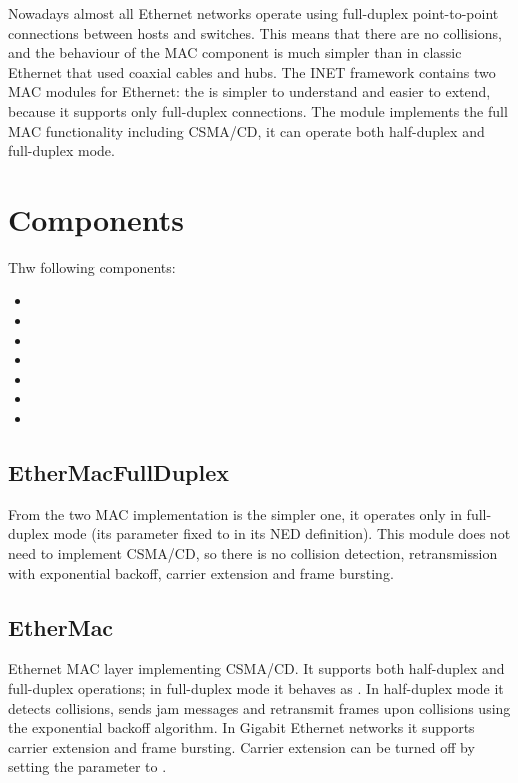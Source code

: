 Nowadays almost all Ethernet networks operate using full-duplex
point-to-point connections between hosts and switches. This means
that there are no collisions, and the behaviour of the MAC component
is much simpler than in classic Ethernet that used coaxial cables and
hubs. The INET framework contains two MAC modules for Ethernet:
the  is simpler to understand and easier to extend,
because it supports only full-duplex connections. The 
module implements the full MAC functionality including CSMA/CD, it
can operate both half-duplex and full-duplex mode.

\section{Components}
\label{sec:ethernet:components}

Thw following components:

\begin{itemize}
  \item {}
  \item {}
  \item {}
  \item {}
  \item {}
  \item {}
  \item {}
\end{itemize}


\subsection{EtherMacFullDuplex}
\label{sec:ethernet:ethermacfullduplex}

From the two MAC implementation  is the simpler one,
it operates only in full-duplex mode (its  parameter fixed to
 in its NED definition). This module does not need to implement
CSMA/CD, so there is no collision detection, retransmission with exponential backoff,
carrier extension and frame bursting.

\subsection{EtherMac}
\label{sec:ethernet:ethermac}

Ethernet MAC layer implementing CSMA/CD. It supports both half-duplex and full-duplex operations;
in full-duplex mode it behaves as . In half-duplex mode
it detects collisions, sends jam messages and retransmit frames upon collisions using
the exponential backoff algorithm. In Gigabit Ethernet networks it supports carrier
extension and frame bursting. Carrier extension can be turned off by setting the
 parameter to .


